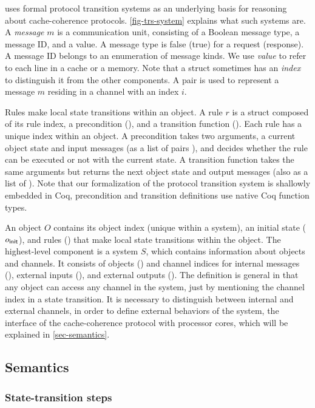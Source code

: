 \hemiola{} uses formal protocol transition systems as an underlying basis for reasoning about cache-coherence protocols.
\autoref{fig-trs-system} explains what such systems are.
A \emph{message} $m$ is a communication unit, consisting of a Boolean message type, a message ID, and a value.
A message type is false (true) for a request (response).
A message ID belongs to an enumeration of message kinds.
We use \emph{value} to refer to each line in a cache or a memory.
Note that a struct sometimes has an \emph{index} to distinguish it from the other components.
A pair  is used to represent a message $m$ residing in a channel with an index $i$.

Rules make local state transitions within an object.
A rule $r$ is a struct composed of its rule index, a precondition (), and a transition function ().
Each rule has a unique index within an object.
A precondition  takes two arguments, a current object state and input messages (as a list of pairs ), and decides whether the rule can be executed or not with the current state.
A transition function takes the same arguments but returns the next object state and output messages (also as a list of ).
Note that our formalization of the protocol transition system is shallowly embedded in Coq, \eg{} precondition and transition definitions use native Coq function types.

An object $O$ contains its object index (unique within a system), an initial state ($o_{\textsf{init}}$), and rules () that make local state transitions within the object.
The highest-level component is a system $S$, which contains information about objects and channels.
It consists of objects () and channel indices for internal messages (), external inputs (), and external outputs ().
The definition is general in that any object can access any channel in the system, just by mentioning the channel index in a state transition.
It is necessary to distinguish between internal and external channels, in order to define external behaviors of the system, \ie{} the interface of the cache-coherence protocol with processor cores, which will be explained in \autoref{sec-semantics}.

\subsection{Semantics}
\label{sec-semantics}

\subsubsection{State-transition steps}

